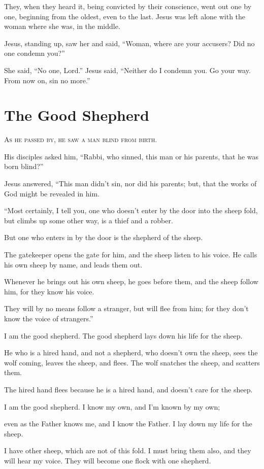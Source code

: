They, when they heard it, being convicted by their conscience, went out one by one, beginning from the oldest, even to the last. Jesus was left alone with the woman where she was, in the middle.

Jesus, standing up, saw her and said, “Woman, where are your accusers? Did no one condemn you?”

She said, “No one, Lord.” Jesus said, “Neither do I condemn you. Go your way. From now on, sin no more.”


\clearpage \section*{The Good Shepherd}

\lettrine{A}{s he passed by, he saw a man blind from birth.}

His disciples asked him, “Rabbi, who sinned, this man or his parents, that he was born blind?”

Jesus answered, “This man didn’t sin, nor did his parents; but, that the works of God might be revealed in him.

“Most certainly, I tell you, one who doesn’t enter by the door into the sheep fold, but climbs up some other way, is a thief and a robber.

But one who enters in by the door is the shepherd of the sheep.

The gatekeeper opens the gate for him, and the sheep listen to his voice. He calls his own sheep by name, and leads them out.

Whenever he brings out his own sheep, he goes before them, and the sheep follow him, for they know his voice.

They will by no means follow a stranger, but will flee from him; for they don’t know the voice of strangers.”

I am the good shepherd. The good shepherd lays down his life for the sheep.

He who is a hired hand, and not a shepherd, who doesn’t own the sheep, sees the wolf coming, leaves the sheep, and flees. The wolf snatches the sheep, and scatters them.

The hired hand flees because he is a hired hand, and doesn’t care for the sheep.

I am the good shepherd. I know my own, and I’m known by my own;

even as the Father knows me, and I know the Father. I lay down my life for the sheep.

I have other sheep, which are not of this fold. I must bring them also, and they will hear my voice. They will become one flock with one shepherd.


